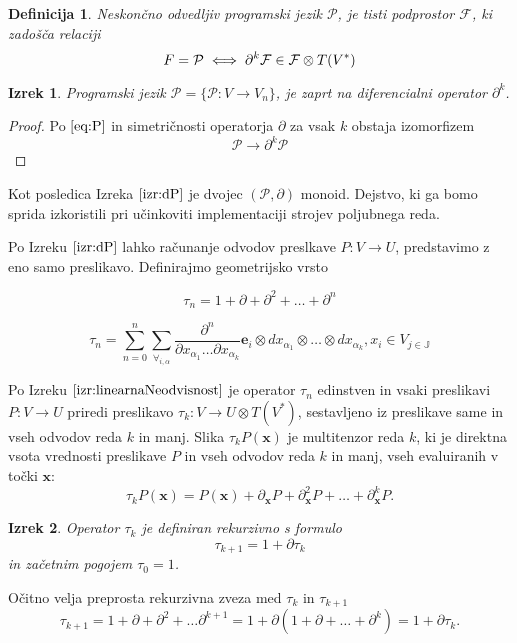 \documentclass{article}
\newcommand{\JJ}{\mathbb{J}}
\newcommand{\e}{\mathbf{e}}
\newcommand{\x}{\mathbf{x}}
\newcommand{\F}{\mathcal{F}}
\newcommand{\dP}{\mathcal{P}}
\newcommand{\D}{\partial}
\newcommand{\sumd}{\tau}
\newtheorem{definicija}{Definicija}[section]
\newtheorem{izrek}{Izrek}[section]
\begin{document}
 \begin{definicija}
 	Neskončno odvedljiv programski jezik $\dP$, je tisti podprostor $\F$, ki zadošča relaciji
 	\begin{equation}\label{eq:P}
 		\\F=\dP\iff\D^k\F\in\F\otimes T(V^*)
 	\end{equation}
 \end{definicija}
 
 \begin{izrek}\label{izr:dP}
	Programski jezik $\dP=\{\dP:V\to V_n\}$, je zaprt na diferencialni operator $\D^k$.
 \end{izrek}
 
 \begin{proof}
 	 Po $\eqref{eq:P}$ in simetričnosti operatorja $\D$ za vsak $k$ obstaja izomorfizem
 	 	\begin{equation}
 	 		\dP\to\D^k\dP
 	 	\end{equation}
 \end{proof}
 
 Kot posledica Izreka $\ref{izr:dP}$ je dvojec $(\dP,\D)$ monoid. Dejstvo, ki ga bomo sprida izkoristili pri učinkoviti implementaciji strojev poljubnega reda.

Po Izreku $\ref{izr:dP}$ lahko računanje odvodov preslkave $P:V\to U$, predstavimo z eno samo
preslikavo. Definirajmo geometrijsko vrsto
 
 \begin{equation}\label{eq:DD}
  	\sumd_n = 1+\D +\D^2 +\ldots + \D^n 
  \end{equation}
  
  
  \begin{equation}
  	\sumd_n=\sum\limits_{n=0}^{n}\sum_{\forall_{i,\alpha}}\frac{\partial^n}{\partial
  		    x_{\alpha_1}\ldots \partial x_{\alpha_k}}\e_i\otimes
  		  dx_{\alpha_1}\otimes\ldots \otimes dx_{\alpha_k} , x_i\in V_{j\in\JJ}
  \end{equation}
  
  Po Izreku $\ref{izr:linearnaNeodvisnost}$ je operator $\sumd_n$ edinstven in vsaki preslikavi $P: V\to U$ priredi preslikavo $\sumd_k:V\to
U\otimes T(V^*)$, sestavljeno iz preslikave same in vseh odvodov reda $k$ in
manj. Slika $\sumd_kP(\x)$ je multitenzor reda $k$, ki je direktna vsota
vrednosti preslikave $P$ in vseh odvodov reda $k$ in manj, vseh evaluiranih v
točki $\x$:
\begin{equation}
  \label{eq:multi_odvod}
  \sumd_kP(\x) = P(\x)+\D_\x P + \D^2_\x P + \ldots + \D^k_\x P.
\end{equation}
\begin{izrek}
  Operator $\sumd_k$ je definiran rekurzivno s formulo
  \begin{equation}
    \label{eq:potenca(1+d)}
    \sumd_{k+1}=1+\D\sumd_{k}
  \end{equation}
in začetnim pogojem $\tau_0=1$.
\end{izrek}
Očitno velja preprosta rekurzivna zveza med $\sumd_k$ in $\sumd_{k+1}$
\begin{equation}
   \label{eq:rekurzija}
   \sumd_{k+1} = 1 + \D +\D^2+\ldots \D^{k+1} = 1+\D(1+\D+\ldots +\D^{k}) = 1+\D\sumd_k.
\end{equation} 
\end{document}

